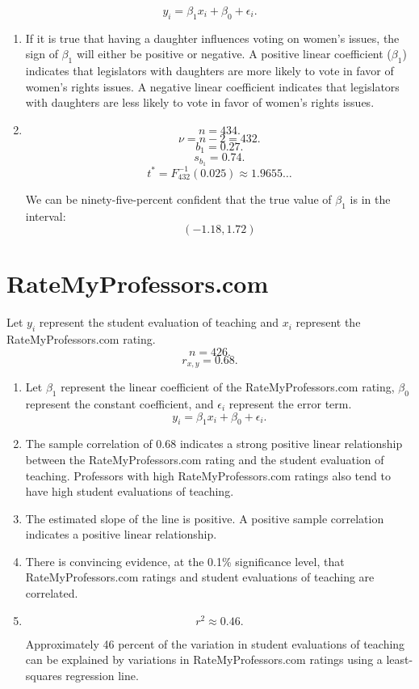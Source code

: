 \documentclass[12pt]{article}
\begin{document}
\[y_i=\beta_1x_i+\beta_0+\epsilon_i.\]

\begin{enumerate}
\item If it is true that having a daughter influences voting on women's issues, the sign of $\beta_1$ will either be positive or negative. A positive linear coefficient ($\beta_1$) indicates that legislators with daughters are more likely to vote in favor of women's rights issues. A negative linear coefficient indicates that legislators with daughters are less likely to vote in favor of women's rights issues.
\item
\[n=434.\]
\[\nu=n-2=432.\]
\[b_1=0.27.\]
\[s_{b_1}=0.74.\]
\[t^*=F^{-1}_{432}(0.025)\approx 1.9655\dots\]

We can be ninety-five-percent confident that the true value of $\beta_1$ is in the interval:
\[(-1.18,1.72)\]

\end{enumerate}
\section{RateMyProfessors.com}
Let $y_i$ represent the student evaluation of teaching and $x_i$ represent the RateMyProfessors.com rating.
\[n=426.\]
\[r_{x,y}=0.68.\]
\begin{enumerate}
\item Let $\beta_1$ represent the linear coefficient of the RateMyProfessors.com rating, $\beta_0$ represent the constant coefficient, and $\epsilon_i$ represent the error term.
\[y_i=\beta_1x_i+\beta_0+\epsilon_i.\]
\item The sample correlation of 0.68 indicates a strong positive linear relationship between the RateMyProfessors.com rating and the student evaluation of teaching. Professors with high RateMyProfessors.com ratings also tend to have high student evaluations of teaching.
\item The estimated slope of the line is positive. A positive sample correlation indicates a positive linear relationship.
\item There is convincing evidence, at the 0.1\% significance level, that RateMyProfessors.com ratings and student evaluations of teaching are correlated.
\item\[r^2\approx 0.46.\]

Approximately 46 percent of the variation in student evaluations of teaching can be explained by variations in RateMyProfessors.com ratings using a least-squares regression line.
\end{enumerate}
\end{document}
